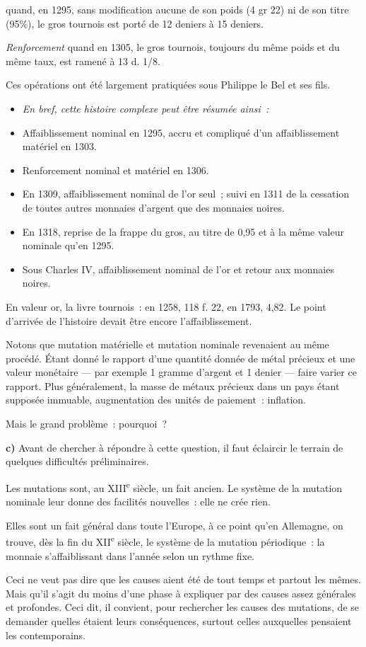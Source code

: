 \documentclass[french,twoside]{book} %
\newlength{\listmod}
\newcommand{\listhead}[1]{\hspace{-1\listmod}\emph{#1}}
\newcommand{\labelchar}[1]{\textbf{\color{rubric} #1}}
\begin{document}
 quand, en 1295, sans modification aucune de son poids (4 gr 22) ni de son titre (95\%), le gros tournois est porté de 12 deniers à 15 deniers.\par
\label{p92}{\itshape Renforcement} quand en 1305, le gros tournois, toujours du même poids et du même taux, est ramené à 13 d. 1/8.\par
Ces opérations ont été largement pratiquées sous Philippe le Bel et ses fils.\par

\begin{itemize}[itemsep=0pt,]
\item[]\listhead{En bref, cette histoire complexe peut être résumée ainsi :}
\item Affaiblissement nominal en 1295, accru et compliqué d’un affaiblissement matériel en 1303.
\item Renforcement nominal et matériel en 1306.
\item En 1309, affaiblissement nominal de l’or seul ; suivi en 1311 de la cessation de toutes autres monnaies d’argent que des monnaies noires.
\item En 1318, reprise de la frappe du gros, au titre de 0,95 et à la même valeur nominale qu’en 1295.
\item Sous Charles IV, affaiblissement nominal de l’or et retour aux monnaies noires.
\end{itemize}

\noindent En valeur or, la livre tournois : en 1258, 118 f. 22, en 1793, 4,82. Le point d’arrivée de l’histoire devait être encore l’affaiblissement.\par
Notons que mutation matérielle et mutation nominale revenaient au même procédé. Étant donné le rapport d’une quantité donnée de métal précieux et une valeur monétaire — par exemple 1 gramme d’argent et 1 denier — faire varier ce rapport. Plus généralement, la masse de métaux précieux dans un pays étant supposée immuable, augmentation des unités de paiement : inflation.\par
Mais le grand problème : pourquoi ?\par
\labelchar{c)} Avant de chercher à répondre à cette question, il faut éclaircir le terrain de quelques difficultés préliminaires.\par
Les mutations sont, au XIII\textsuperscript{e} siècle, un fait ancien. Le système de la mutation nominale leur donne des facilités nouvelles : elle ne crée rien.\par
Elles sont un fait général dans toute l’Europe, à ce point qu’en Allemagne, on trouve, dès la fin du XII\textsuperscript{e} siècle, le système de la mutation périodique : la monnaie s’affaiblissant dans l’année selon un rythme fixe.\par
Ceci ne veut pas dire que les causes aient été de tout temps et partout les mêmes. Mais qu’il s’agit du moins d’une phase à expliquer par des causes assez générales et profondes. Ceci dit, il convient, pour rechercher les causes des mutations, de se demander quelles étaient leurs conséquences, surtout celles auxquelles pensaient les contemporains.\par
\end{document}
